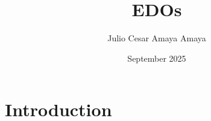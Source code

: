 \documentclass{article}
\title{EDOs}
\author{Julio Cesar Amaya Amaya}
\date{September 2025}
\begin{document}
\maketitle

\section{Introduction}
\end{document}
